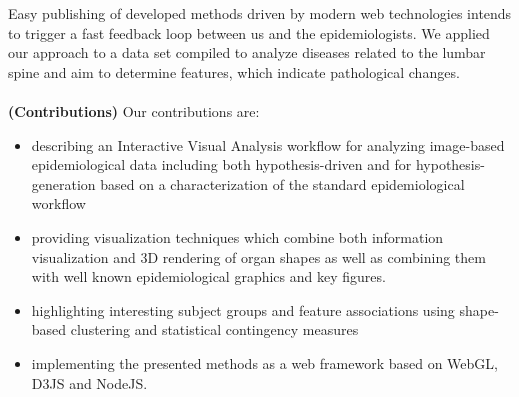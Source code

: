 \documentclass[journal]{style/vgtc} 			          %
\begin{document}
%
Easy publishing of developed methods driven by modern web technologies intends to trigger a fast feedback loop between us and the epidemiologists.
We applied our approach to a data set compiled to analyze diseases related to the lumbar spine and aim to determine features, which indicate pathological changes.
\\\\
\textbf{(Contributions)}
Our contributions are:
\begin{itemize}
	\item describing an Interactive Visual Analysis workflow for analyzing image-based epidemiological data including both hypothesis-driven and for hypothesis-generation based on a characterization of the standard epidemiological workflow
	\item providing visualization techniques which combine both information visualization and 3D rendering of organ shapes as well as combining them with well known epidemiological graphics and key figures.
	\item highlighting interesting subject groups and feature associations using shape-based clustering and statistical contingency measures
	\item implementing the presented methods as a web framework based on WebGL, D3JS and NodeJS.
\end{itemize}
\end{document}
